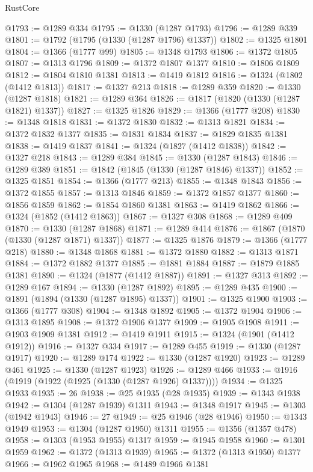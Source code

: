 \begin{lexlean}{RustCore}
\begin{coremodule}
@1793 := @1289 @334
@1795 := @1330 (@1287 @1793)
@1796 := @1289 @339
@1801 := @1792 (@1795 (@1330 (@1287 @1796) @1337))
@1802 := @1325 @1801
@1804 := @1366 (@1777 @99)
@1805 := @1348 @1793
@1806 := @1372 @1805
@1807 := @1313 @1796
@1809 := @1372 @1807 @1377
@1810 := @1806 @1809
@1812 := @1804 @1810 @1381
@1813 := @1419 @1812
@1816 := @1324 (@1802 (@1412 @1813))
@1817 := @1327 @213
@1818 := @1289 @359
@1820 := @1330 (@1287 @1818)
@1821 := @1289 @364
@1826 := @1817 (@1820 (@1330 (@1287 @1821) @1337))
@1827 := @1325 @1826
@1829 := @1366 (@1777 @208)
@1830 := @1348 @1818
@1831 := @1372 @1830
@1832 := @1313 @1821
@1834 := @1372 @1832 @1377
@1835 := @1831 @1834
@1837 := @1829 @1835 @1381
@1838 := @1419 @1837
@1841 := @1324 (@1827 (@1412 @1838))
@1842 := @1327 @218
@1843 := @1289 @384
@1845 := @1330 (@1287 @1843)
@1846 := @1289 @389
@1851 := @1842 (@1845 (@1330 (@1287 @1846) @1337))
@1852 := @1325 @1851
@1854 := @1366 (@1777 @213)
@1855 := @1348 @1843
@1856 := @1372 @1855
@1857 := @1313 @1846
@1859 := @1372 @1857 @1377
@1860 := @1856 @1859
@1862 := @1854 @1860 @1381
@1863 := @1419 @1862
@1866 := @1324 (@1852 (@1412 @1863))
@1867 := @1327 @308
@1868 := @1289 @409
@1870 := @1330 (@1287 @1868)
@1871 := @1289 @414
@1876 := @1867 (@1870 (@1330 (@1287 @1871) @1337))
@1877 := @1325 @1876
@1879 := @1366 (@1777 @218)
@1880 := @1348 @1868
@1881 := @1372 @1880
@1882 := @1313 @1871
@1884 := @1372 @1882 @1377
@1885 := @1881 @1884
@1887 := @1879 @1885 @1381
@1890 := @1324 (@1877 (@1412 @1887))
@1891 := @1327 @313
@1892 := @1289 @167
@1894 := @1330 (@1287 @1892)
@1895 := @1289 @435
@1900 := @1891 (@1894 (@1330 (@1287 @1895) @1337))
@1901 := @1325 @1900
@1903 := @1366 (@1777 @308)
@1904 := @1348 @1892
@1905 := @1372 @1904
@1906 := @1313 @1895
@1908 := @1372 @1906 @1377
@1909 := @1905 @1908
@1911 := @1903 @1909 @1381
@1912 := @1419 @1911
@1915 := @1324 (@1901 (@1412 @1912))
@1916 := @1327 @334
@1917 := @1289 @455
@1919 := @1330 (@1287 @1917)
@1920 := @1289 @174
@1922 := @1330 (@1287 @1920)
@1923 := @1289 @461
@1925 := @1330 (@1287 @1923)
@1926 := @1289 @466
@1933 := @1916 (@1919 (@1922 (@1925 (@1330 (@1287 @1926) @1337))))
@1934 := @1325 @1933
@1935 := 26
@1938 := @25 @1935 (@28 @1935)
@1939 := @1343 @1938
@1942 := @1304 (@1287 @1939) @1311
@1943 := @1348 @1917
@1945 := @1303 (@1942 @1943)
@1946 := 27
@1949 := @25 @1946 (@28 @1946)
@1950 := @1343 @1949
@1953 := @1304 (@1287 @1950) @1311
@1955 := @1356 (@1357 @478)
@1958 := @1303 (@1953 @1955) @1317
@1959 := @1945 @1958
@1960 := @1301 @1959
@1962 := @1372 (@1313 @1939)
@1965 := @1372 (@1313 @1950) @1377
@1966 := @1962 @1965
@1968 := @1489 @1966 @1381

\end{coremodule}
\end{lexlean}
